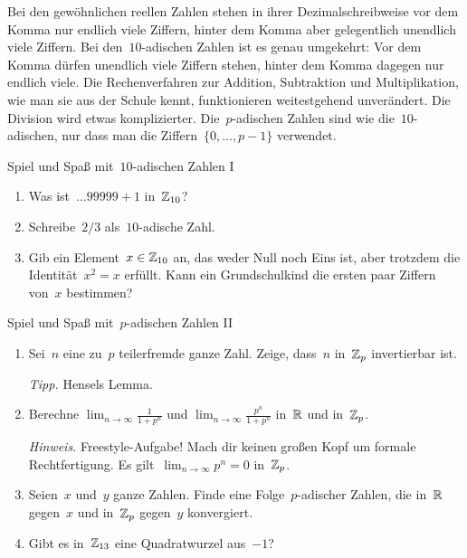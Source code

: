 \documentclass[entwurf]{uebblatt}
\begin{document}

{\small
Bei den gewöhnlichen reellen Zahlen stehen in ihrer Dezimalschreibweise vor dem
Komma nur endlich viele Ziffern, hinter dem Komma aber gelegentlich unendlich
viele Ziffern. Bei den~$10$-adischen Zahlen ist es genau umgekehrt: Vor dem
Komma dürfen unendlich viele Ziffern stehen, hinter dem Komma dagegen nur
endlich viele. Die Rechenverfahren zur Addition, Subtraktion und
Multiplikation, wie man sie aus der Schule kennt, funktionieren weitestgehend
unverändert. Die Division wird etwas komplizierter. Die~$p$-adischen Zahlen
sind wie die~$10$-adischen, nur dass man die Ziffern~$\{0,\ldots,p-1\}$
verwendet.\par}

\bigskip

\begin{aufgabe}{Spiel und Spaß mit~$10$-adischen Zahlen I}
\begin{enumerate}
\item Was ist~$\ldots 99999 + 1$ in~$\mathbb{Z}_{10}$?
\item Schreibe~$2/3$ als~$10$-adische Zahl.
\item Gib ein Element~$x \in \mathbb{Z}_{10}$ an, das weder Null noch Eins ist, aber trotzdem
die Identität~$x^2 = x$ erfüllt. Kann ein Grundschulkind die ersten paar
Ziffern von~$x$ bestimmen?
\end{enumerate}
\end{aufgabe}

\begin{aufgabe}{Spiel und Spaß mit~$p$-adischen Zahlen II}
\begin{enumerate}
\item Sei~$n$ eine zu~$p$ teilerfremde ganze Zahl. Zeige, dass~$n$ in~$\mathbb{Z}_p$
invertierbar ist.

{\tiny\emph{Tipp.} Hensels Lemma.\par}
\item Berechne $\lim_{n \to \infty} \frac{1}{1 + p^n}$ und $\lim_{n \to \infty}
\frac{p^n}{1 + p^n}$ in~$\mathbb{R}$ und in~$\mathbb{Z}_p$.

{\tiny\emph{Hinweis.} Freestyle-Aufgabe! Mach dir keinen großen Kopf um formale
Rechtfertigung. Es gilt~$\lim_{n \to \infty} p^n = 0$ in~$\mathbb{Z}_p$.\par}
\item Seien~$x$ und~$y$ ganze Zahlen. Finde eine Folge~$p$-adischer Zahlen, die
in~$\mathbb{R}$ gegen~$x$ und in~$\mathbb{Z}_p$ gegen~$y$ konvergiert.
\item Gibt es in~$\mathbb{Z}_{13}$ eine Quadratwurzel aus~$-1$?
\end{enumerate}
\end{aufgabe}
\end{document}

